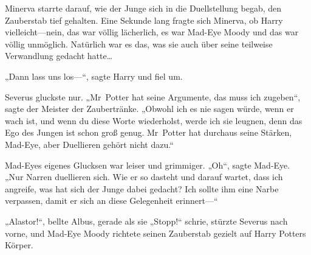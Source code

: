 \later

Minerva starrte darauf, wie der Junge sich in die Duellstellung begab, den Zauberstab tief gehalten. Eine Sekunde lang fragte sich Minerva, ob Harry vielleicht—nein, das war völlig lächerlich, es war Mad-Eye Moody und das war völlig unmöglich. Natürlich war es das, was sie auch über seine teilweise Verwandlung gedacht hatte…

„Dann lass uns los—“, sagte Harry und fiel um.

Severus gluckste nur. „Mr~Potter hat seine Argumente, das muss ich zugeben“, sagte der Meister der Zaubertränke. „Obwohl ich es nie sagen würde, wenn er wach ist, und wenn du diese Worte wiederholst, werde ich sie leugnen, denn das Ego des Jungen ist schon groß genug. Mr~Potter hat durchaus seine Stärken, Mad-Eye, aber Duellieren gehört nicht dazu.“

Mad-Eyes eigenes Glucksen war leiser und grimmiger. „Oh“, sagte Mad-Eye. „Nur Narren duellieren sich. Wie er so dasteht und darauf wartet, dass ich angreife, was hat sich der Junge dabei gedacht? Ich sollte ihm eine Narbe verpassen, damit er sich an diese Gelegenheit erinnert—“

„Alastor!“, bellte Albus, gerade als sie „Stopp!“ schrie, stürzte Severus nach vorne, und Mad-Eye Moody richtete seinen Zauberstab gezielt auf Harry Potters Körper.


